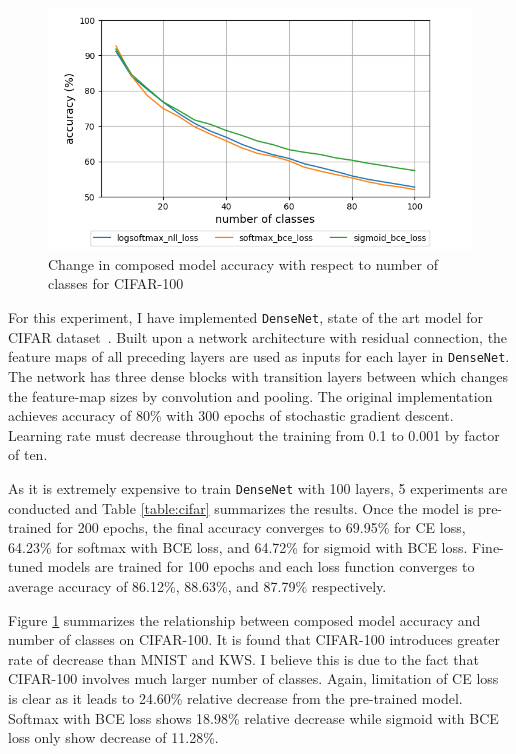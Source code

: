 \documentclass{article}
\begin{document}
\begin{figure}[t]
    \centering
    \includegraphics[scale=0.4,trim={0mm 0mm 0mm 0mm},clip]{cifar100.png}
    \caption{Change in composed model accuracy with respect to number of classes for CIFAR-100}
    \label{figure:composed_cifar}
\end{figure}


For this experiment, I have implemented \texttt{DenseNet}, state of the art model for CIFAR dataset~\cite{huang2017densely}. Built upon a network architecture with residual connection, the feature maps of all preceding layers are used as inputs for each layer in \texttt{DenseNet}. The network has three dense blocks with transition layers between which changes the feature-map sizes by convolution and pooling. The original implementation achieves accuracy of 80\% with 300 epochs of stochastic gradient descent. Learning rate must decrease throughout the training from 0.1 to 0.001 by factor of ten.

As it is extremely expensive to train \texttt{DenseNet} with 100 layers, 5 experiments are conducted and Table \ref{table:cifar} summarizes the results. Once the model is pre-trained for 200 epochs, the final accuracy converges to 69.95\% for CE loss, 64.23\% for softmax with BCE loss, and 64.72\% for sigmoid with BCE loss. Fine-tuned models are trained for 100 epochs and each loss function converges to average accuracy of 86.12\%, 88.63\%, and 87.79\% respectively.

Figure \ref{figure:composed_cifar} summarizes the relationship between composed model accuracy and number of classes on CIFAR-100. It is found that CIFAR-100 introduces greater rate of decrease than MNIST and KWS. I believe this is due to the fact that CIFAR-100 involves much larger number of classes. Again, limitation of CE loss is clear as it leads to 24.60\% relative decrease from the pre-trained model. Softmax with BCE loss shows 18.98\% relative decrease while sigmoid with BCE loss only show decrease of 11.28\%.
\end{document}
